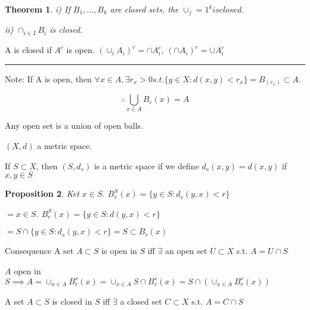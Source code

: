 \documentclass[twoside]{article}
\newcounter{lecnum}
\newtheorem{theorem}{Theorem}[lecnum]
\newtheorem{proposition}[theorem]{Proposition}
\newenvironment{proof}{{\bf Proof:}}{\hfill\rule{2mm}{2mm}}
\begin{document}
\begin{theorem}
    i) If $B_1, ..., B_k$ are closed sets, the $\cup_j=1^k is closed.$

    ii) $\cap_{i \in I} B_i$ is closed. 
\end{theorem}

\begin{proof}
    A is closed if $A^c$ is open. $(\cup_i A_i)^c = \cap A_i^c$, $(\cap A_i)^c = \cup A_i^c$
\end{proof}

Note: If A is open, then $\forall x \in A, \exists r_x > 0 s.t. \{y \in X : d(x,y) < r_x\} = B_(r_x) \subset A$.

$$\therefore \bigcup_{x\in A}B_r(x) = A$$

Any open set is a union of open balls. 

$(X,d) $ a metric space. 

If $S \subset X$, then $(S, d_s)$ is a metric space if we define $d_s(x,y) = d(x,y) $ if $x, y \in S$

\begin{proposition}
    Ket $x \in S$. $B_r^S(x) = \{y \in S : d_s(y,x) < r\}$

    $= x \in S$. $B_r^S(x) = \{y \in S : d(y,x) < r\}$

    $= S \cap \{y \in S : d_s(y,x) < r\} = S \subset B_r(x)$
\end{proposition}

Consequence A set $A \subset S$ is open in $S$ iff $\exists $ an open set $U \subset X$ s.t. $A = U \cap S$

$A$ open in $S \implies A = \cup_{x \in A} B_r^s(x) = \cup_{x \in A} S \cap B_r^s(x) =  S \cap  (\cup_{x \in A} B_r^s(x))$

A set $A \subset S$ is closed in $S$ iff $\exists $ a closed set $C \subset X$ s.t. $A = C \cap S$
\end{document}
